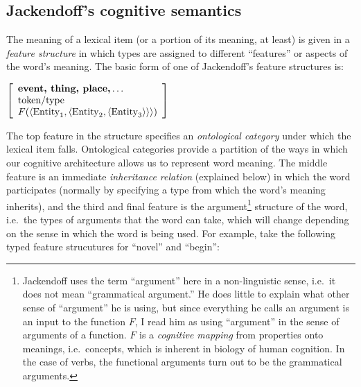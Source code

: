 \subsection{Jackendoff's cognitive semantics}

The meaning of a lexical item (or a portion of its meaning, at least) is given in a \emph{feature structure} in which types are assigned to different ``features'' or aspects of the word's meaning. The basic form of one of Jackendoff's feature structures is:
\par\vspace{5mm}
$\left[
\begin{array}{l}
\textbf{event, thing, place,}\mathellipsis \\
\text{token/type} \\
F(\langle\text{Entity}_1,\langle\text{Entity}_2,\langle\text{Entity}_3\rangle\rangle\rangle)
\end{array}
\right]$
\par\vspace{5mm}
The top feature in the structure specifies an \emph{ontological category} under which the lexical item falls. Ontological categories provide a partition of the ways in which our cognitive architecture allows us to represent word meaning. The middle feature is an immediate \emph{inheritance relation} (explained below) in which the word participates (normally by specifying a type from which the word's meaning inherits), and the third and final feature is the argument\footnote{Jackendoff uses the term ``argument'' here in a non-linguistic sense, i.e.\ it does not mean ``grammatical argument.'' He does little to explain what other sense of ``argument'' he is using, but since everything he calls an argument is an input to the function $F$, I read him as using ``argument'' in the sense of arguments of a function. $F$ is a \emph{cognitive mapping} from properties onto meanings, i.e.\ concepts, which is inherent in biology of human cognition. In the case of verbs, the functional arguments turn out to be the grammatical arguments.} structure of the word, i.e.\ the types of arguments that the word can take, which will change depending on the sense in which the word is being used. For example, take the following typed feature strucutures for ``novel'' and ``begin'':
